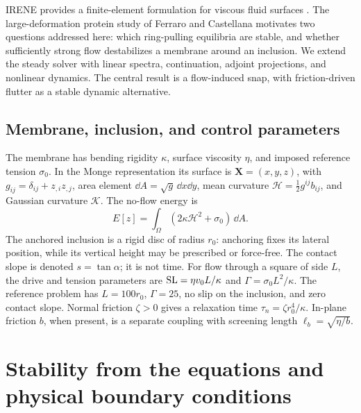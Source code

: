 IRENE provides a finite-element formulation for viscous fluid surfaces \cite{irene}. The large-deformation protein study of Ferraro and Castellana \cite{ferraro} motivates two questions addressed here: which ring-pulling equilibria are stable, and whether sufficiently strong flow destabilizes a membrane around an inclusion. We extend the steady solver with linear spectra, continuation, adjoint projections, and nonlinear dynamics. The central result is a flow-induced snap, with friction-driven flutter as a stable dynamic alternative.

\subsection{Membrane, inclusion, and control parameters}
The membrane has bending rigidity $\kappa$, surface viscosity $\eta$, and imposed reference tension $\sigma_0$. In the Monge representation its surface is $\bm X=(x,y,z)$, with $g_{ij}=\delta_{ij}+z_{,i}z_{,j}$, area element $\dd A=\sqrt g\,\dd x\dd y$, mean curvature $\mathcal H=\tfrac12g^{ij}b_{ij}$, and Gaussian curvature $\mathcal K$. The no-flow energy is
\begin{equation}
E[z]=\int_\Omega(2\kappa\mathcal H^2+\sigma_0)\,\dd A .\label{eq:energy}
\end{equation}
The anchored inclusion is a rigid disc of radius $r_0$: anchoring fixes its lateral position, while its vertical height may be prescribed or force-free. The contact slope is denoted $s=\tan\alpha$; it is not time. For flow through a square of side $L$, the drive and tension parameters are $\mathrm{SL}=\eta v_0L/\kappa$ and $\Gamma=\sigma_0L^2/\kappa$. The reference problem has $L=100r_0$, $\Gamma=25$, no slip on the inclusion, and zero contact slope. Normal friction $\zeta>0$ gives a relaxation time $\tau_n=\zeta r_0^4/\kappa$. In-plane friction $b$, when present, is a separate coupling with screening length $\ell_b=\sqrt{\eta/b}$.

\clearpage
\section{Stability from the equations and physical boundary conditions}
